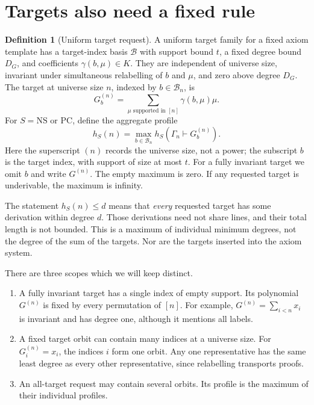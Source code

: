 \documentclass[11pt,a4paper,oneside,openany]{book}
\theoremstyle{definition}\newtheorem{definition}[theorem]{Definition}
\theoremstyle{remark}\newtheorem{remark}[theorem]{Remark}
\newcommand{\NS}{\mathrm{NS}}\newcommand{\PC}{\mathrm{PC}}
\numberwithin{equation}{chapter}
\begin{document}
\section{Targets also need a fixed rule}\label{tx:sec:target-request}
\begin{definition}[Uniform target request]\label{tx:def:target}
A uniform target family for a fixed axiom template has a target-index
basis $\mathcal B$ with support bound $t$, a fixed degree bound $D_G$,
and coefficients $\gamma(b,\mu)\in K$. They are independent of universe size,
invariant under simultaneous relabelling of $b$ and $\mu$, and zero
above degree $D_G$. The target at universe size $n$, indexed by $b\in\mathcal B_n$, is
\[
                  G_b^{(n)}=\sum_{\mu\text{ supported in }[n]}
                                     \gamma(b,\mu)\mu.
\]
For $S=\NS$ or $\PC$, define the aggregate profile
\begin{equation}\label{tx:eq:target-profile}
 h_S(n)=\max_{b\in\mathcal B_n}h_S(\Gamma_n\vdash G_b^{(n)}).
\end{equation}
Here the superscript $(n)$ records the universe size, not a power;
the subscript $b$ is the target index, with support of size at most $t$.
For a fully invariant target we omit $b$ and write $G^{(n)}$.
The empty maximum is zero. If any requested target is underivable,
the maximum is infinity.
\end{definition}

The statement $h_S(n)\le d$ means that \emph{every} requested target
has some derivation within degree $d$. Those derivations need not share
lines, and their total length is not bounded. This is a maximum of
individual minimum degrees, not the degree of the sum of the targets.
Nor are the targets inserted into the axiom system.

There are three scopes which we will keep distinct.
\begin{enumerate}
\item A fully invariant target has a single index of empty support.
Its polynomial $G^{(n)}$ is fixed by every permutation of $[n]$. For
example, $G^{(n)}=\sum_{i<n}x_i$ is invariant and has degree one, although
it mentions all labels.
\item A fixed target orbit can contain many indices at a universe size. For
$G_i^{(n)}=x_i$, the indices $i$ form one orbit. Any one representative
has the same least degree as every other representative, since
relabelling transports proofs.
\item An all-target request may contain several orbits. Its profile
is the maximum of their individual profiles.
\end{enumerate}
\end{document}
